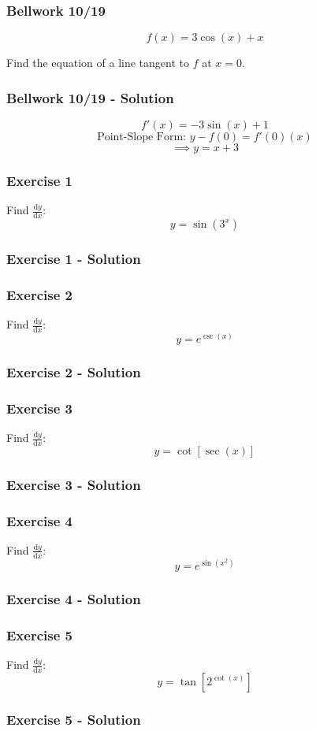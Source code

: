 \documentclass[12pt]{beamer}
\begin{document}
\begin{frame}
	\frametitle{Bellwork 10/19}
	\initclock

	\vfill
	\vfill
	\vfill
	\Large
	\[f(x)=3\cos(x)+x\]
	\vfill
	\begin{center}
		Find the equation of a line tangent to $f$ at $x = 0$.
	\end{center}
	\vfill
	\vfill
	\vfill
	\vfill

	\small
	\crono
\end{frame}
\begin{frame}
	\frametitle{Bellwork 10/19 - Solution}

	\Large
	\[f'(x)=-3\sin(x)+1\]
	\vfill
	\[\text{Point-Slope Form: }y-f(0)=f'(0)(x)\]
	\[\implies \boxed{y=x+3}\]
\end{frame}
\begin{frame}
	\frametitle{Exercise 1}

	\vfill
	\LARGE
	Find $\frac{\mathrm{d}y}{\mathrm{d}x}$:
	\vfill
	\[y=\sin(3^x)\]
	\vfill
	\vfill
	\vfill
\end{frame}
\begin{frame}
	\frametitle{Exercise 1 - Solution}

	
\end{frame}
\begin{frame}
	\frametitle{Exercise 2}

	\vfill
	\LARGE
	Find $\frac{\mathrm{d}y}{\mathrm{d}x}$:
	\vfill
	\[y=e^{\csc(x)}\]
	\vfill
	\vfill
	\vfill
\end{frame}
\begin{frame}
	\frametitle{Exercise 2 - Solution}

	
\end{frame}
\begin{frame}
	\frametitle{Exercise 3}

	\vfill
	\LARGE
	Find $\frac{\mathrm{d}y}{\mathrm{d}x}$:
	\vfill
	\[y=\cot[\sec(x)]\]
	\vfill
	\vfill
	\vfill
\end{frame}
\begin{frame}
	\frametitle{Exercise 3 - Solution}

	
\end{frame}
\begin{frame}
	\frametitle{Exercise 4}

	\vfill
	\LARGE
	Find $\frac{\mathrm{d}y}{\mathrm{d}x}$:
	\vfill
	\[y=e^{\sin(x^2)}\]
	\vfill
	\vfill
	\vfill
\end{frame}
\begin{frame}
	\frametitle{Exercise 4 - Solution}

	
\end{frame}
\begin{frame}
	\frametitle{Exercise 5}

	\vfill
	\LARGE
	Find $\frac{\mathrm{d}y}{\mathrm{d}x}$:
	\vfill
	\[y=\tan\left[2^{\cot(x)}\right]\]
	\vfill
	\vfill
	\vfill
\end{frame}
\begin{frame}
	\frametitle{Exercise 5 - Solution}

	
\end{frame}
\end{document}
